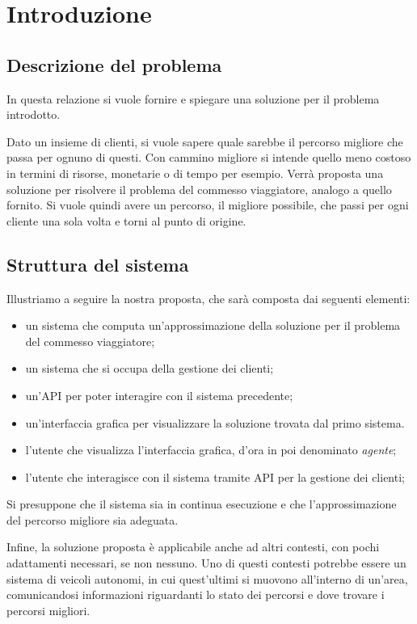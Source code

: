 \chapter{Introduzione}\label{ch:intro}

\section{Descrizione del problema}
In questa relazione si vuole fornire e spiegare una soluzione per il problema introdotto.

Dato un insieme di clienti, si vuole sapere quale sarebbe il percorso migliore che passa per ognuno di questi.
Con cammino migliore si intende quello meno costoso in termini di risorse, monetarie o di tempo per esempio.
Verrà proposta una soluzione per risolvere il problema del commesso viaggiatore, analogo a quello fornito.
Si vuole quindi avere un percorso, il migliore possibile, che passi per ogni cliente una sola volta e torni al punto di origine.

\section{Struttura del sistema}
Illustriamo a seguire la nostra proposta, che sarà composta dai seguenti elementi:
\begin{itemize}
    \item un sistema che computa un'approssimazione della soluzione per il problema del commesso viaggiatore;
    \item un sistema che si occupa della gestione dei clienti;
    \item un'API per poter interagire con il sistema precedente;
    \item un'interfaccia grafica per visualizzare la soluzione trovata dal primo sistema.
    \item l'utente che visualizza l'interfaccia grafica, d'ora in poi denominato \textit{agente};
    \item l'utente che interagisce con il sistema tramite API per la gestione dei clienti;
\end{itemize}
Si presuppone che il sistema sia in continua esecuzione e che l'approssimazione del percorso migliore sia adeguata.

Infine, la soluzione proposta è applicabile anche ad altri contesti, con pochi adattamenti necessari, se non nessuno.
Uno di questi contesti potrebbe essere un sistema di veicoli autonomi, in cui quest'ultimi si muovono all'interno di un'area,
comunicandosi informazioni riguardanti lo stato dei percorsi e dove trovare i percorsi migliori.

